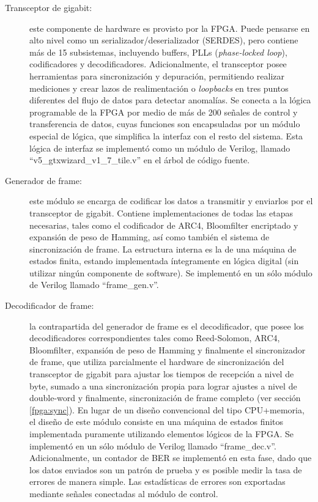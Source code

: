 \begin{description}
 \item[Transceptor de gigabit:] este componente de hardware es provisto por la FPGA. Puede pensarse en alto nivel como un serializador/deserializador (SERDES), pero contiene más de 15 subsistemas, incluyendo buffers, PLLs (\textit{phase-locked loop}), codificadores y decodificadores. Adicionalmente, el transceptor posee herramientas para sincronización y depuración, permitiendo realizar mediciones y crear lazos de realimentación o \textit{loopbacks} en tres puntos diferentes del flujo de datos para detectar anomalías. Se conecta a la lógica programable de la FPGA por medio de más de 200 señales de control y transferencia de datos, cuyas funciones son encapsuladas por un módulo especial de lógica, que simplifica la interfaz con el resto del sistema. Esta lógica de interfaz se implementó como un módulo de Verilog, llamado ``v5\_gtxwizard\_v1\_7\_tile.v'' en el árbol de código fuente.

 \item[Generador de frame:] este módulo se encarga de codificar los datos a transmitir y enviarlos por el transceptor de gigabit. Contiene implementaciones de todas las etapas necesarias, tales como el codificador de ARC4, Bloomfilter encriptado y expansión de peso de Hamming, así como también el sistema de sincronización de frame. La estructura interna es la de una máquina de estados finita, estando implementada íntegramente en lógica digital (sin utilizar ningún componente de software). Se implementó en un sólo módulo de Verilog llamado ``frame\_gen.v''.
 
 \item[Decodificador de frame:] la contrapartida del generador de frame es el decodificador, que posee los decodificadores correspondientes tales como Reed-Solomon, ARC4, Bloomfilter, expansión de peso de Hamming y finalmente el sincronizador de frame, que utiliza parcialmente el hardware de sincronización del transceptor de gigabit para ajustar los tiempos de recepción a nivel de byte, sumado a una sincronización propia para lograr ajustes a nivel de double-word y finalmente, sincronización de frame completo (ver sección \ref{fpga:sync}). En lugar de un diseño convencional del tipo CPU+memoria, el diseño de este módulo consiste en una máquina de estados finitos implementada puramente utilizando elementos lógicos de la FPGA. Se implementó en un sólo módulo de Verilog llamado ``frame\_dec.v''. Adicionalmente, un contador de BER se implementó en esta fase, dado que los datos enviados son un patrón de prueba y es posible medir la tasa de errores de manera simple. Las estadísticas de errores son exportadas mediante señales conectadas al módulo de control.
 

\end{description}
